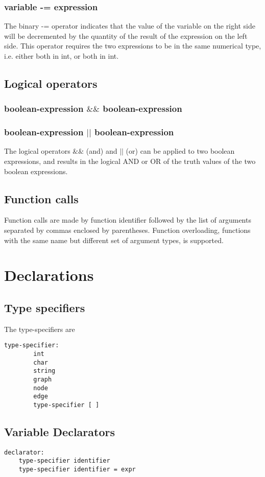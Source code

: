 \documentclass[a4paper,12pt]{article}
\begin{document}
\subsubsection{variable -= expression}
The binary -= operator indicates that the value of the variable on the right side will be decremented by the quantity of the result of the expression on the left side. This operator requires the two expressions to be in the same numerical type, i.e. either both in int, or both in int.
\subsection{Logical operators}
\subsubsection{boolean-expression $\&\&$ boolean-expression}
\subsubsection{boolean-expression $||$ boolean-expression}
The logical operators $\&\&$ (and) and $||$ (or) can be applied to two boolean expressions, and results in the logical AND or OR of the truth values of the two boolean expressions.

\subsection{Function calls}
Function calls are made by function identifier followed by the list of arguments separated by commas enclosed by parentheses. Function overloading, functions with the same name but different set of argument types, is supported.

\section{Declarations}
\subsection{Type specifiers}
The type-specifiers are

\begin{lstlisting}
type-specifier:
		int
		char
		string
		graph
		node
		edge
		type-specifier [ ]
\end{lstlisting}
	
\subsection{Variable Declarators}
\begin{lstlisting}
declarator:
	type-specifier identifier
	type-specifier identifier = expr
\end{lstlisting}
	
\end{document}
